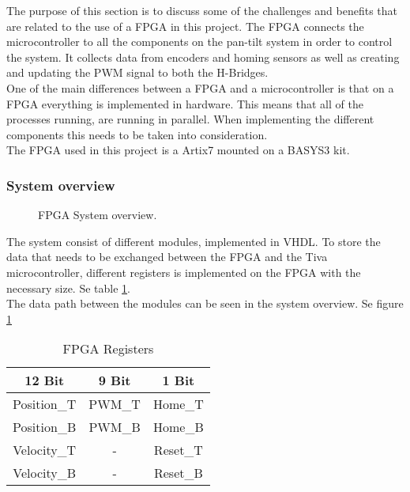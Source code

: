 \documentclass[../../../main]{subfiles}
\begin{document}
The purpose of this section is to discuss some of the challenges and benefits that are related to the use of a FPGA in this project.
The FPGA connects the microcontroller to all the components on the pan-tilt system in order to control the system. It collects data from encoders and homing sensors as well as creating and updating the PWM signal to both the H-Bridges.
\\
One of the main differences between a FPGA and a microcontroller is that on a FPGA everything is implemented in hardware. This means that all of the processes running, are running in parallel. When implementing the different components this needs to be taken into consideration. 
\\
The FPGA used in this project is a Artix7 mounted on a BASYS3 kit. 
\subsubsection{System overview}%
\label{sub:system_overview}

\begin{figure}[H]
  \centering
  \def\svgwidth{\textwidth}
  
  \caption{FPGA System overview.}
  \label{fig:FPGA_system_overview}
\end{figure}

The system consist of different modules, implemented in VHDL.
To store the data that needs to be exchanged between the FPGA and the Tiva microcontroller, different registers is implemented on the FPGA with the necessary size. Se table \ref{table:FPGA_registers}.
\\
The data path between the modules can be seen in the system overview. Se figure \ref{fig:FPGA_system_overview}
\begin{table}[H]
\centering
\begin{tabular}{|c|c|c|}
\hline
\textbf{12 Bit} & \textbf{9 Bit} & \textbf{1 Bit} \\ \hline
Position\_T     & PWM\_T         & Home\_T        \\ \hline
Position\_B     & PWM\_B         & Home\_B        \\ \hline
Velocity\_T     & -              & Reset\_T       \\ \hline
Velocity\_B     & -              & Reset\_B       \\ \hline
\end{tabular}
\caption{FPGA Registers}
\label{table:FPGA_registers}
\end{table}
\end{document}
